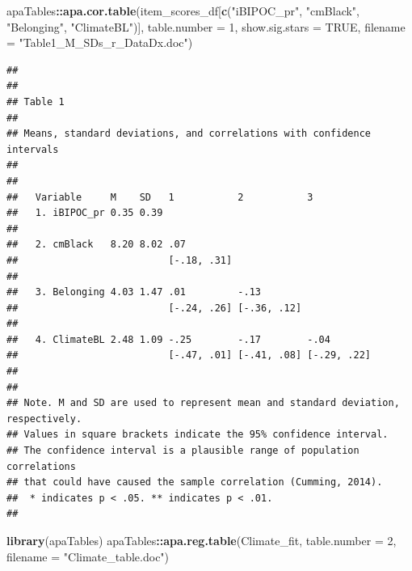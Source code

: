 \documentclass[
  11pt,
]{book}
\newenvironment{Shaded}{\begin{snugshade}}{\end{snugshade}}
\newcommand{\AttributeTok}[1]{\textcolor[rgb]{0.27,0.27,0.27}{#1}}
\newcommand{\ConstantTok}[1]{\textcolor[rgb]{0.37,0.37,0.37}{#1}}
\newcommand{\DecValTok}[1]{\textcolor[rgb]{0.06,0.06,0.06}{#1}}
\newcommand{\FunctionTok}[1]{\textcolor[rgb]{0.27,0.27,0.27}{\textbf{#1}}}
\newcommand{\NormalTok}[1]{#1}
\newcommand{\SpecialCharTok}[1]{\textcolor[rgb]{0.43,0.43,0.43}{\textbf{#1}}}
\newcommand{\StringTok}[1]{\textcolor[rgb]{0.5,0.5,0.5}{#1}}
\begin{document}
\begin{Shaded}
\begin{Highlighting}[]
\NormalTok{apaTables}\SpecialCharTok{::}\FunctionTok{apa.cor.table}\NormalTok{(item\_scores\_df[}\FunctionTok{c}\NormalTok{(}\StringTok{"iBIPOC\_pr"}\NormalTok{, }\StringTok{"cmBlack"}\NormalTok{, }\StringTok{"Belonging"}\NormalTok{,}
    \StringTok{"ClimateBL"}\NormalTok{)], }\AttributeTok{table.number =} \DecValTok{1}\NormalTok{, }\AttributeTok{show.sig.stars =} \ConstantTok{TRUE}\NormalTok{, }\AttributeTok{filename =} \StringTok{"Table1\_M\_SDs\_r\_DataDx.doc"}\NormalTok{)}
\end{Highlighting}
\end{Shaded}

\begin{verbatim}
## 
## 
## Table 1 
## 
## Means, standard deviations, and correlations with confidence intervals
##  
## 
##   Variable     M    SD   1           2           3          
##   1. iBIPOC_pr 0.35 0.39                                    
##                                                             
##   2. cmBlack   8.20 8.02 .07                                
##                          [-.18, .31]                        
##                                                             
##   3. Belonging 4.03 1.47 .01         -.13                   
##                          [-.24, .26] [-.36, .12]            
##                                                             
##   4. ClimateBL 2.48 1.09 -.25        -.17        -.04       
##                          [-.47, .01] [-.41, .08] [-.29, .22]
##                                                             
## 
## Note. M and SD are used to represent mean and standard deviation, respectively.
## Values in square brackets indicate the 95% confidence interval.
## The confidence interval is a plausible range of population correlations 
## that could have caused the sample correlation (Cumming, 2014).
##  * indicates p < .05. ** indicates p < .01.
## 
\end{verbatim}

\begin{Shaded}
\begin{Highlighting}[]
\FunctionTok{library}\NormalTok{(apaTables)}
\NormalTok{apaTables}\SpecialCharTok{::}\FunctionTok{apa.reg.table}\NormalTok{(Climate\_fit, }\AttributeTok{table.number =} \DecValTok{2}\NormalTok{, }\AttributeTok{filename =} \StringTok{"Climate\_table.doc"}\NormalTok{)}
\end{Highlighting}
\end{Shaded}
\end{document}
